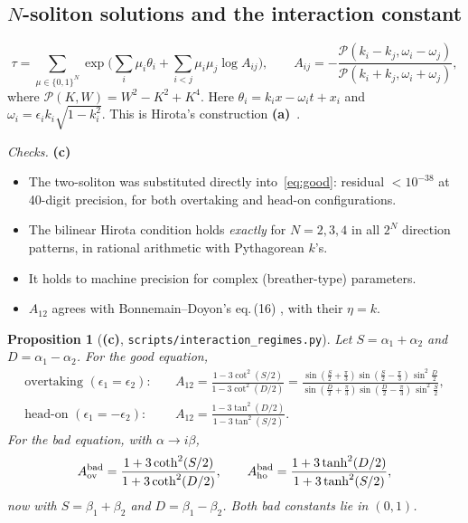 \documentclass[11pt,a4paper]{article}
\newcommand{\La}{\textsf{\textbf{(a)}}}
\newcommand{\Lc}{\textsf{\textbf{(c)}}}
\newcommand{\script}[1]{\texttt{scripts/#1}}
\newtheorem{proposition}{Proposition}[section]
\theoremstyle{remark}
\begin{document}
\subsection{\texorpdfstring{$N$}{N}-soliton solutions and the interaction constant}

\begin{equation}\label{eq:Nsol}
\tau=\sum_{\mu\in\{0,1\}^N}\exp\Big(\sum_i\mu_i\theta_i+\sum_{i<j}\mu_i\mu_j\log A_{ij}\Big),\qquad
A_{ij}=-\frac{\mathcal P(k_i-k_j,\omega_i-\omega_j)}{\mathcal P(k_i+k_j,\omega_i+\omega_j)} ,
\end{equation}
where $\mathcal P(K,W)=W^2-K^2+K^4$. Here $\theta_i=k_ix-\omega_it+x_i$ and $\omega_i=\epsilon_ik_i\sqrt{1-k_i^2}$. This is Hirota's construction \La~\cite{Hirota73}.

\emph{Checks.} \Lc
\begin{itemize}
\item The two-soliton was substituted directly into~\eqref{eq:good}: residual $<10^{-38}$ at 40-digit precision, for both overtaking and head-on configurations.
\item The bilinear Hirota condition holds \emph{exactly} for $N=2,3,4$ in all $2^N$ direction patterns, in rational arithmetic with Pythagorean $k$'s.
\item It holds to machine precision for complex (breather-type) parameters.
\item $A_{12}$ agrees with Bonnemain--Doyon's eq.\,(16) \cite{BD}, with their $\eta=k$.
\end{itemize}

\begin{proposition}[\Lc, \script{interaction\_regimes.py}]\label{prop:A}
Let $S=\alpha_1+\alpha_2$ and $D=\alpha_1-\alpha_2$. For the good equation,
\begin{align}
\text{overtaking } (\epsilon_1=\epsilon_2):&\quad A_{12}=\frac{1-3\cot^2(S/2)}{1-3\cot^2(D/2)}
=\frac{\sin(\frac S2+\frac\pi3)\sin(\frac S2-\frac\pi3)\,\sin^2\frac D2}{\sin(\frac D2+\frac\pi3)\sin(\frac D2-\frac\pi3)\,\sin^2\frac S2},\label{eq:Aov}\\
\text{head-on } (\epsilon_1=-\epsilon_2):&\quad A_{12}=\frac{1-3\tan^2(D/2)}{1-3\tan^2(S/2)} .\label{eq:Aho}
\end{align}
For the bad equation, with $\alpha\to i\beta$,
\begin{equation}
A^{\rm bad}_{\rm ov}=\frac{1+3\coth^2(S/2)}{1+3\coth^2(D/2)},\qquad A^{\rm bad}_{\rm ho}=\frac{1+3\tanh^2(D/2)}{1+3\tanh^2(S/2)} ,
\end{equation}
now with $S=\beta_1+\beta_2$ and $D=\beta_1-\beta_2$. Both bad constants lie in $(0,1)$.
\end{proposition}
\end{document}
